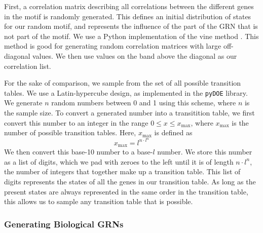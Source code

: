 \documentclass[../main.tex]{subfiles}
\begin{document}
First, a correlation matrix describing all correlations between the different genes in the motif is randomly generated.
This defines an initial distribution of states for our random motif, and represents the influence of the part of the GRN that is not part of the motif.
We use a Python implementation of the vine method \cite{lewandowski2009generating}. %
This method is good for generating random correlation matrices with large off-diagonal values.
We then use values on the band above the diagonal as our correlation list. %

For the sake of comparison, we sample from the set of all possible transition tables.
We use a Latin-hypercube design, as implemented in the \texttt{pyDOE} library.
We generate $n$ random numbers between 0 and 1 using this scheme, where $n$ is the sample size.
To convert a generated number into a transitition table, we first convert this number to an integer in the range $0 \le x \le x_\mathrm{max}$, where $x_\mathrm{max}$ is the number of possible transition tables.
Here, $x_\mathrm{max}$ is defined as 
\begin{equation}
x_\mathrm{max} = l^{n \cdot l^n}
\end{equation}
We then convert this base-10 number to a base-$l$ number.
We store this number as a list of digits, which we pad with zeroes to the left until it is of length $n \cdot l^n$, the number of integers that together make up a transition table.
This list of digits represents the states of all the genes in our transition table.
As long as the present states are always represented in the same order in the transition table, this allows us to sample any transition table that is possible.

\subsubsection{Generating Biological GRNs}
\end{document}
